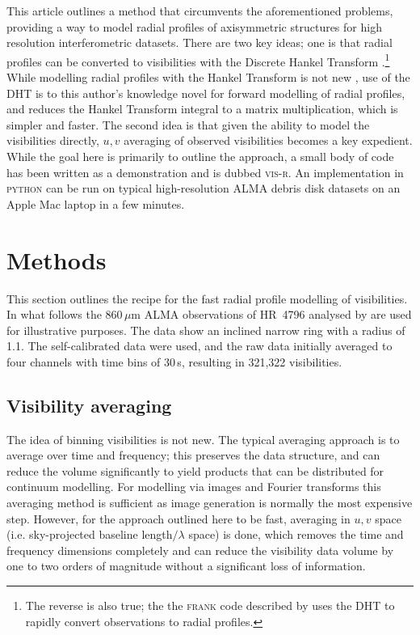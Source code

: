\documentclass[fleqn,usenatbib]{mnras}
\begin{document}
This article outlines a method that circumvents the aforementioned problems, providing a way to model radial profiles of axisymmetric structures for high resolution interferometric datasets. There are two key ideas; one is that radial profiles can be converted to visibilities with the Discrete Hankel Transform \citep[DHT,][]{2015JOSAA..32..611B}.\footnote{The reverse is also true; the the \textsc{frank} code described by \citet{2020MNRAS.tmp.1491J} uses the DHT to rapidly convert observations to radial profiles.}  While modelling radial profiles with the Hankel Transform is not new \citep[e.g.][]{2018ApJ...869L..48G}, use of the DHT is to this author's knowledge novel for forward modelling of radial profiles, and reduces the Hankel Transform integral to a matrix multiplication, which is simpler and faster. The second idea is that given the ability to model the visibilities directly, $u,v$ averaging of observed visibilities becomes a key expedient. While the goal here is primarily to outline the approach, a small body of code has been written as a demonstration and is dubbed \textsc{vis-r}. An implementation in \textsc{python} can be run on typical high-resolution ALMA debris disk datasets on an Apple Mac laptop in a few minutes.

\section{Methods}

This section outlines the recipe for the fast radial profile modelling of visibilities. In what follows the 860\,$\mu$m ALMA observations of HR~4796 analysed by \citet{2018MNRAS.475.4924K} are used for illustrative purposes. The data show an inclined narrow ring with a radius of 1.1\arcsec. The self-calibrated data were used, and the raw data initially averaged to four channels with time bins of 30\,s, resulting in 321,322 visibilities.

\subsection{Visibility averaging}\label{sec:avg}

The idea of binning visibilities is not new. The typical averaging approach is to average over time and frequency; this preserves the data structure, and can reduce the volume significantly to yield products that can be distributed for continuum modelling. For modelling via images and Fourier transforms this averaging method is sufficient as image generation is normally the most expensive step. However, for the approach outlined here to be fast, averaging in $u,v$ space (i.e. sky-projected baseline length$/\lambda$ space) is done, which removes the time and frequency dimensions completely and can reduce the visibility data volume by one to two orders of magnitude without a significant loss of information.
\end{document}

